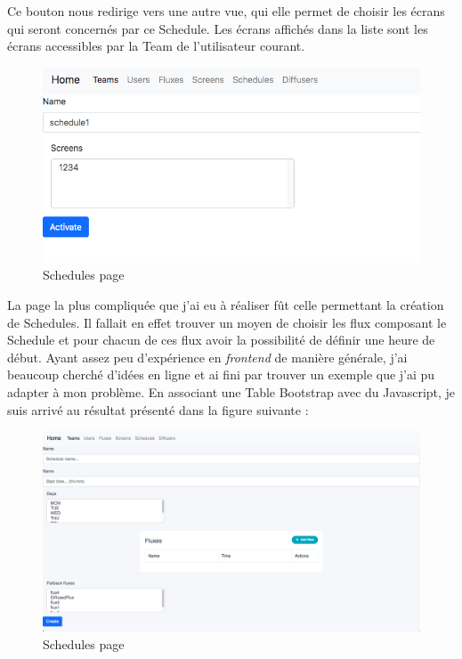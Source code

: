 \documentclass[french]{article}
\begin{document}
Ce bouton nous redirige vers une autre vue, qui elle permet de choisir les écrans qui seront concernés par ce Schedule. Les écrans affichés dans la liste sont les écrans accessibles par la Team de l'utilisateur courant.

\begin{figure}[h]
	\centering	
	\includegraphics[width=0.8\linewidth]{interface/schedulepage_activation.png}%
	\caption{Schedules page}
\end{figure} 
\newpage
La page la plus compliquée que j'ai eu à réaliser fût celle permettant la création de Schedules. Il fallait en effet trouver un moyen de choisir les flux composant le Schedule et pour chacun de ces flux avoir la possibilité de définir une heure de début. Ayant assez peu d'expérience en \textit{frontend} de manière générale, j'ai beaucoup cherché d'idées en ligne et ai fini par trouver un exemple que j'ai pu adapter à mon problème. En associant une Table Bootstrap avec du Javascript, je suis arrivé au résultat présenté dans la figure suivante :

\begin{figure}[h]
	\centering	
	\includegraphics[width=0.8\linewidth]{interface/schedulepage_creation.png}%
	\caption{Schedules page}
\end{figure} 
\end{document}
